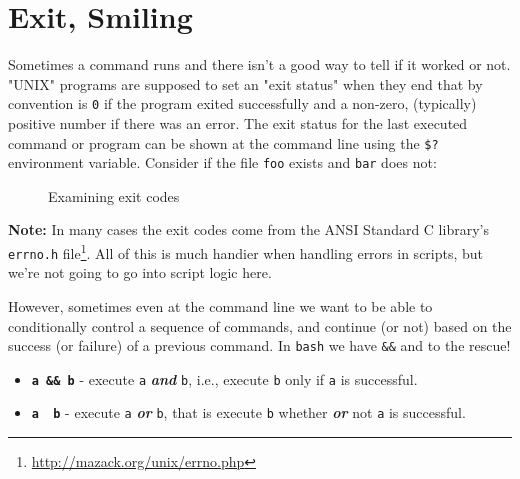 \documentclass[10pt,american,]{book}
\newenvironment{Shaded}{\begin{snugshade}}{\end{snugshade}}
\newcommand{\KeywordTok}[1]{\textcolor[rgb]{0.13,0.29,0.53}{\textbf{{#1}}}}
\newcommand{\OtherTok}[1]{\textcolor[rgb]{0.56,0.35,0.01}{{#1}}}
\newcommand{\NormalTok}[1]{{#1}}
\renewcommand{\href}[2]{#2\footnote{\url{#1}}}
\numberwithin{figure}{chapter}
\DeclareRobustCommand{\drcap}[1]{\begin{figure}[H]\caption{#1}\end{figure}}
\renewcommand{\KeywordTok}[1]{{#1}}
\renewcommand{\OtherTok}[1]{{#1}}
\renewcommand{\NormalTok}[1]{{#1}}
\begin{document}
\section*{Exit, Smiling}\label{exit-smiling}

Sometimes a command runs and there isn't a good way to tell if it worked
or not. "UNIX" programs are supposed to set an "exit status" when they
end that by convention is \texttt{0} if the program exited successfully
and a non-zero, (typically) positive number if there was an error. The
exit status for the last executed command or program can be shown at the
command line using the \texttt{\$?}
 environment
variable. Consider if the file \texttt{foo} exists and \texttt{bar} does
not:

\drcap{Examining exit codes}

\begin{Shaded}
\end{Shaded}

\textbf{Note:} In many cases the exit codes come from the ANSI Standard
C library's \href{http://mazack.org/unix/errno.php}{\texttt{errno.h}
file}. All of this is much handier when handling errors in scripts, but
we're not going to go into script logic here.

However, sometimes even at the command line we want to be able to
conditionally control a sequence of commands, and continue (or not)
based on the success (or failure) of a previous command. In
\texttt{bash} we have
\texttt{\&\&}
and \texttt{\textbar{}\textbar{}}
 to the rescue!

\begin{itemize}
\item
  \textbf{\texttt{a\ \&\&\ b}} - execute \texttt{a} \textbf{\emph{and}}
  \texttt{b}, i.e., execute \texttt{b} only if \texttt{a} is successful.
\item
  \textbf{\texttt{a\ \textbar{}\textbar{}\ b}} - execute \texttt{a}
  \textbf{\emph{or}} \texttt{b}, that is execute \texttt{b} whether
  \textbf{\emph{or}} not \texttt{a} is successful.
\end{itemize}
\end{document}
